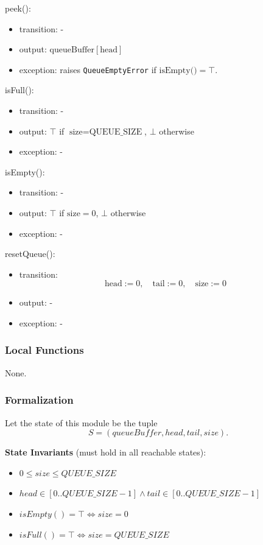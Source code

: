 \documentclass[12pt, titlepage]{article}
\begin{document}
\noindent peek():
\begin{itemize}
\item transition: -
\item output: $\text{queueBuffer}[\text{head}]$
\item exception: raises \texttt{QueueEmptyError} if $\text{isEmpty()} = \top$.
\end{itemize}

\noindent isFull():
\begin{itemize}
\item transition: -
\item output: $\top$ if $\text{size} = \text{QUEUE\_SIZE}$, $\bot$ otherwise
\item exception: -
\end{itemize}

\noindent isEmpty():
\begin{itemize}
\item transition: -
\item output: $\top$ if $\text{size} = 0$, $\bot$ otherwise
\item exception: -
\end{itemize}

\noindent resetQueue():
\begin{itemize}
\item transition:
\[
\text{head} := 0, \quad \text{tail} := 0, \quad \text{size} := 0
\]
\item output: -
\item exception: -
\end{itemize}

\subsubsection{Local Functions}
None.

\subsubsection{Formalization}

Let the state of this module be the tuple
\[
S = (queueBuffer, head, tail, size).
\]

\noindent \textbf{State Invariants} (must hold in all reachable states):

\begin{itemize}
    \item $0 \le size \le QUEUE\_SIZE$
    \item $head \in [0..QUEUE\_SIZE-1] \wedge tail \in [0..QUEUE\_SIZE-1]$
    \item $isEmpty() = \top \iff size = 0$
    \item $isFull() = \top \iff size = QUEUE\_SIZE$
\end{itemize}
\end{document}

